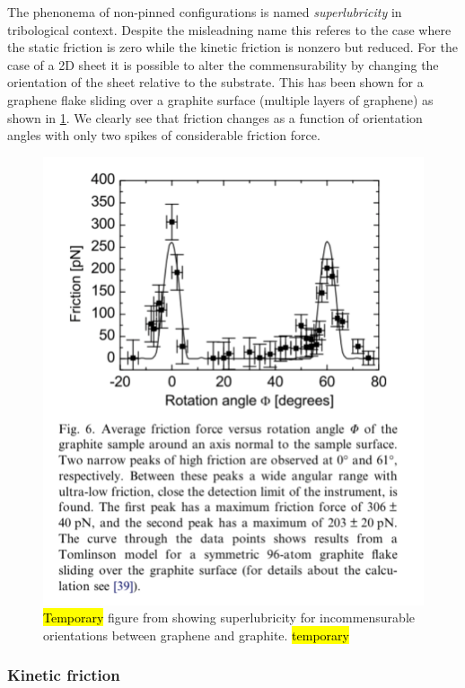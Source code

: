 The phenonema of non-pinned configurations is named \textit{superlubricity} in
tribological context. Despite the misleadning name this referes to the case
where the static friction is zero while the kinetic friction is nonzero but
reduced. For the case of a 2D sheet it is possible to alter the commensurability
by changing the orientation of the sheet relative to the substrate. This has
been shown for a graphene flake sliding over a graphite surface
(multiple layers of graphene) \cite{DIENWIEBEL2005197} as shown in \cref{fig:graphene_rot}. We clearly see that friction changes as a function of orientation angles with only two spikes of considerable friction force.


\begin{figure}[H]
  \centering
  \includegraphics[width=0.5\linewidth]{figures/theory/graphene_rot.png}
  \caption{\hl{Temporary} figure from \cite{DIENWIEBEL2005197} showing superlubricity for incommensurable orientations between graphene and graphite. \hl{temporary}}
  \label{fig:graphene_rot}
\end{figure}



\subsubsection{Kinetic friction}





